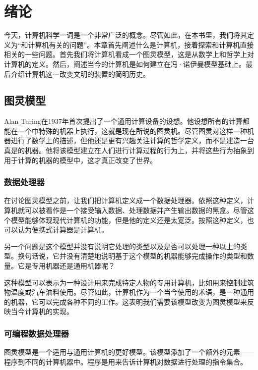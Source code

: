 \chapter{绪论}

今天，计算机科学一词是一个非常广泛的概念。尽管如此，在本书里，我们将其定义为“和计算机有关的问题”。本章首先阐述什么是计算机，接着探索和计算机直接相关的一些问题。首先我们将计算机看成一个图灵模型，这是从数学上和哲学上对计算机的定义。然后，阐述当今的计算机是如何建立在冯·诺伊曼模型基础上。最后介绍计算机这一改变文明的装置的简明历史。

\section{图灵模型}

Alan Turing在1937年首次提出了一个通用计算设备的设想。他设想所有的计算都能在一个中特殊的机器上执行，这就是现在所说的图灵机。尽管图灵对这样一种机器进行了数学上的描述，但他还是更有兴趣关注计算的哲学定义，而不是建造一台真是的机器。他将该模型建立在人们进行计算过程的行为上，并将这些行为抽象到用于计算的机器的模型中，这才真正改变了世界。

\subsection{数据处理器}

在讨论图灵模型之前，让我们把计算机定义成一个数据处理器。依照这种定义，计算机就可以被看作是一个接受输入数据、处理数据并产生输出数据的黑盒。尽管这个模型能够体现现代计算机的功能，但是他的定义还是太宽泛。按照这种定义，也可以认为便携式计算器是计算机。

另一个问题是这个模型并没有说明它处理的类型以及是否可以处理一种以上的类型。换句话说，它并没有清楚地说明基于这个模型的机器能够完成操作的类型和数量。它是专用机器还是通用机器呢？

这种模型可以表示为一种设计用来完成特定人物的专用计算机，比如用来控制建筑物温度或汽车油料使用。尽管如此，计算机作为一个当今使用的术语，是一种通用的机器，它可以完成各种不同的工作。这表明我们需要该模型改变为图灵模型来反映当今计算机的实现。

\subsection{可编程数据处理器}

图灵模型是一个适用与通用计算机的更好模型。该模型添加了一个额外的元素——程序到不同的计算机器中。程序是用来告诉计算机对数据进行处理的指令集合。

